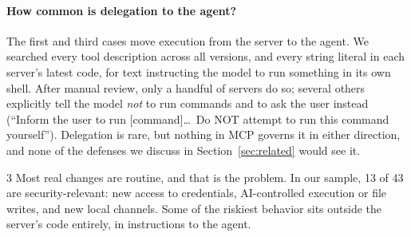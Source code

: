 \paragraph{How common is delegation to the agent?}
The first and third cases move execution from the server to the agent. We searched every tool description across all versions, and every string literal in each server's latest code, for text instructing the model to run something in its own shell. After manual review, only a handful of servers do so; several others explicitly tell the model \emph{not} to run commands and to ask the user instead (``Inform the user to run [command]\ldots\ Do NOT attempt to run this command yourself''). Delegation is rare, but nothing in MCP governs it in either direction, and none of the defenses we discuss in Section~\ref{sec:related} would see it.

\begin{finding}{3}
Most real changes are routine, and that is the problem. In our sample, 13 of 43 are security-relevant: new access to credentials, AI-controlled execution or file writes, and new local channels. Some of the riskiest behavior sits outside the server's code entirely, in instructions to the agent.
\end{finding}
